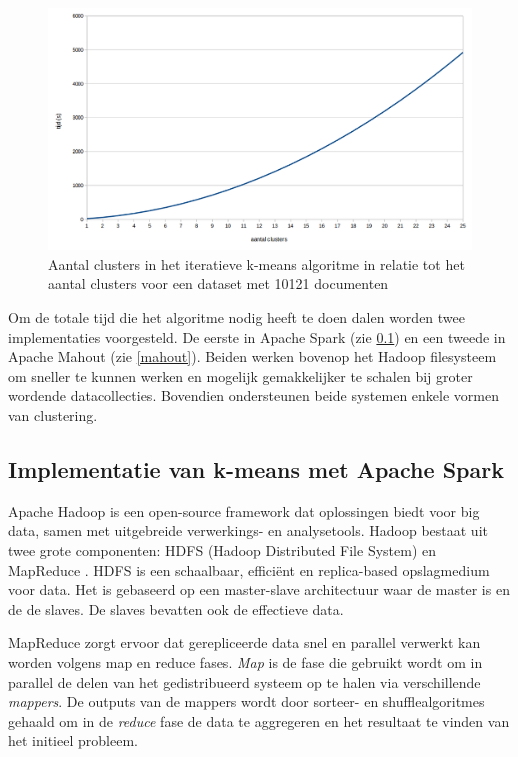 \begin{figure}[h]
	\caption{Aantal clusters in het iteratieve k-means algoritme in relatie tot het aantal clusters voor een dataset met 10121 documenten}
	\label{fig:clustering-10000-exp}	
	\includegraphics[width=\textwidth]{fig/clustering-10000-exp.png}
\end{figure}

Om de totale tijd die het algoritme nodig heeft te doen dalen worden twee implementaties voorgesteld. De eerste in Apache Spark (zie \ref{spark}) en een tweede in Apache Mahout (zie \ref{mahout}). Beiden werken bovenop het Hadoop filesysteem om sneller te kunnen werken en mogelijk gemakkelijker te schalen bij groter wordende datacollecties. Bovendien ondersteunen beide systemen enkele vormen van clustering. 

\subsection{Implementatie van k-means met Apache Spark}\label{spark}
Apache Hadoop \cite{hadoop} is een open-source framework dat oplossingen biedt voor big data, samen met uitgebreide verwerkings- en analysetools. Hadoop bestaat uit twee grote componenten: HDFS (Hadoop Distributed File System) en MapReduce \cite{Dean}. HDFS is een schaalbaar, effici\"ent en replica-based opslagmedium voor data. Het is gebaseerd op een master-slave architectuur waar  de master is en de  de slaves. De slaves bevatten ook de effectieve data. 

MapReduce zorgt ervoor dat gerepliceerde data snel en parallel verwerkt kan worden volgens map en reduce fases. \textit{Map} is de fase die gebruikt wordt om in parallel de delen van het gedistribueerd systeem op te halen via verschillende \textit{mappers}. De outputs van de mappers wordt door sorteer- en shufflealgoritmes gehaald om in de \textit{reduce} fase de data te aggregeren en het resultaat te vinden van het initieel probleem.

